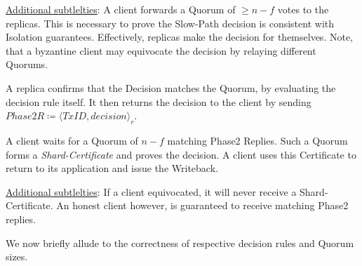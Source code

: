 \underline{Additional subtlelties}: A client forwards a Quorum of $\geq n-f$ votes to the replicas. This is necessary to prove the Slow-Path decision is consistent with Isolation guarantees. Effectively, replicas make the decision for themselves. Note, that a byzantine client may equivocate the decision by relaying different Quorums.

A replica confirms that the Decision matches the Quorum, by evaluating the decision rule itself. It then returns the decision to the client by sending $Phase2R \coloneqq \langle TxID, decision \rangle_r$. 

A client waits for a Quorum of $n-f$ matching Phase2 Replies. Such a Quorum forms a \textit{Shard-Certificate} and proves the decision. A client uses this Certificate to return to its application and issue the Writeback.

\underline{Additional subtlelties}: If a client equivocated, it will never receive a Shard-Certificate. An honest client however, is guaranteed to receive matching Phase2 replies. 

We now briefly allude to the correctness of respective decision rules and Quorum sizes.



